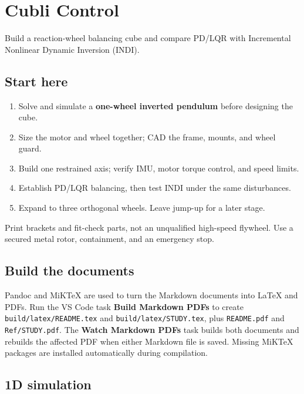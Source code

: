 \documentclass[
]{article}
\author{}
\date{}
\providecommand{\tightlist}{%
  \setlength{\itemsep}{0pt}\setlength{\parskip}{0pt}}
\begin{document}
\section{Cubli Control}\label{cubli-control}

Build a reaction-wheel balancing cube and compare PD/LQR with
Incremental Nonlinear Dynamic Inversion (INDI).

\subsection{Start here}\label{start-here}

\begin{enumerate}
\def\labelenumi{\arabic{enumi}.}
\tightlist
\item
  Solve and simulate a \textbf{one-wheel inverted pendulum} before
  designing the cube.
\item
  Size the motor and wheel together; CAD the frame, mounts, and wheel
  guard.
\item
  Build one restrained axis; verify IMU, motor torque control, and speed
  limits.
\item
  Establish PD/LQR balancing, then test INDI under the same
  disturbances.
\item
  Expand to three orthogonal wheels. Leave jump-up for a later stage.
\end{enumerate}

Print brackets and fit-check parts, not an unqualified high-speed
flywheel. Use a secured metal rotor, containment, and an emergency stop.

\subsection{Build the documents}\label{build-the-documents}

Pandoc and MiKTeX are used to turn the Markdown documents into LaTeX and
PDFs. Run the VS Code task \textbf{Build Markdown PDFs} to create
\texttt{build/latex/README.tex} and \texttt{build/latex/STUDY.tex}, plus
\texttt{README.pdf} and \texttt{Ref/STUDY.pdf}. The \textbf{Watch
Markdown PDFs} task builds both documents and rebuilds the affected PDF
when either Markdown file is saved. Missing MiKTeX packages are
installed automatically during compilation.

\subsection{1D simulation}\label{d-simulation}
\end{document}
